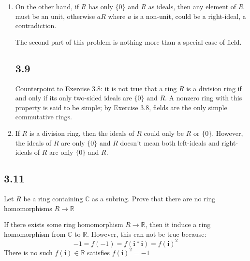 \documentclass[a4paper, pdf, 12pt]{article}
\makeatletter
\renewenvironment{proof}[1][\proofname]{\par
  \pushQED{\qed}%
  \normalfont \topsep6\p@\@plus6\p@\relax
  \trivlist
  \item[%
    \hskip\labelsep
    \normalfont\bfseries %
    #1%
    \@addpunct{.}%
  ]\ignorespaces
}{%
  \popQED\endtrivlist\@endpefalse
}
\let\qed\relax %
\DeclareRobustCommand{\qed}{%
  \ifmmode \mathqed
  \else
    \leavevmode\unskip\penalty\@M\hbox{}\nobreak\hspace{.5em minus .1em}%
    \hbox{\qedsymbol}%
  \fi
}
\makeatother
\begin{document}
\begin{enumerate}
\begin{proof}
    On the other hand, if $R$ has only $\{0\}$ and $R$ as ideals, then any element of $R$ must be 
    an unit, otherwise $aR$ where $a$ is a non-unit, could be a right-ideal, a contradiction.

    The second part of this problem is nothing more than a special case of 
    field.
  \end{proof}
  \subsection*{3.9}
  Counterpoint to Exercise 3.8: it is not true that a ring $R$ is a division ring if and only if 
  its only two-sided ideals are $\{0\}$ and $R$. A nonzero ring with this property is said to be 
  simple; by Exercise 3.8, ﬁelds are the only simple commutative rings.
  \begin{proof}
    If $R$ is a division ring, then the ideals of $R$ could only be $R$ or $\{0\}$. However, the ideals
    of $R$ are only $\{0\}$ and $R$ doesn't mean both left-ideals and right-ideals of $R$ are only 
    $\{0\}$ and $R$.
  \end{proof}
\end{enumerate}
\subsection*{3.11}
Let $R$ be a ring containing $\mathbb{C}$ as a subring. Prove that there are no ring 
homomorphisms $R \rightarrow \mathbb{R}$
\begin{proof}
  If there exists some ring homomorphism $R\rightarrow \mathbb{R}$, then it induce 
  a ring homomorphism from $\mathbb{C}$ to $\mathbb{R}$. However, this can not be true
  because:
  $$
  -1 = f(-1) = f(\mathbf{i} * \mathbf{i}) = f(\mathbf{i})^{2}
  $$
  There is no such $f(\mathbf{i})\in \mathbb{R}$ satisfies $f(\mathbf{i})^{2}=-1$
\end{proof}
\end{document}
